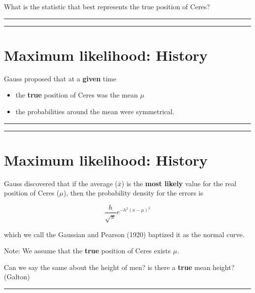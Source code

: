 \documentclass[
]{book}
\providecommand{\tightlist}{%
  \setlength{\itemsep}{0pt}\setlength{\parskip}{0pt}}
\begin{document}
What is the statistic that best represents the true position of Ceres?

\begin{center}\rule{0.5\linewidth}{0.5pt}\end{center}

\begin{center}\rule{0.5\linewidth}{0.5pt}\end{center}

\hypertarget{maximum-likelihood-history-3}{%
\section{Maximum likelihood: History}\label{maximum-likelihood-history-3}}

Gauss proposed that at a \textbf{given} time

\begin{itemize}
\tightlist
\item
  the \textbf{true} position of Ceres was the mean \(\mu\)
\item
  the probabilities around the mean were symmetrical.
\end{itemize}

\begin{center}\rule{0.5\linewidth}{0.5pt}\end{center}

\begin{center}\rule{0.5\linewidth}{0.5pt}\end{center}

\hypertarget{maximum-likelihood-history-4}{%
\section{Maximum likelihood: History}\label{maximum-likelihood-history-4}}

Gauss discovered that if the average (\(\bar{x}\)) is the \textbf{most likely} value for the real position of Ceres (\(\mu\)), then the probability density for the errors is

\[\frac{h}{\sqrt{\pi}}e^{-h^2(x-\mu)^2}\]

which we call the Gaussian and Pearson (1920) baptized it as the normal curve.

Note: We assume that the \textbf{true} position of Ceres exists \(\mu\).

Can we say the same about the height of men? is there a \textbf{true} mean height? (Galton)

\begin{center}\rule{0.5\linewidth}{0.5pt}\end{center}
\end{document}
